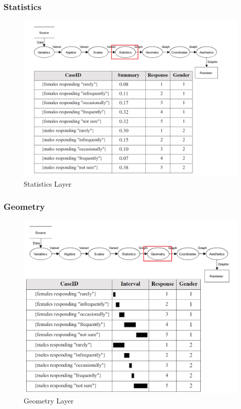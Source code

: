 \documentclass[12pt]{article}
\begin{document}
\subsubsection{Statistics}
\begin{figure}[h!]
\caption{Statistics Layer}
\includegraphics[width=\textwidth]{pic/pre4}
\end{figure}
\newpage
\subsubsection{Geometry}
\begin{figure}[h!]
\caption{Geometry Layer}
\includegraphics[width=\textwidth]{pic/pre5}
\end{figure}
\newpage
\end{document}
